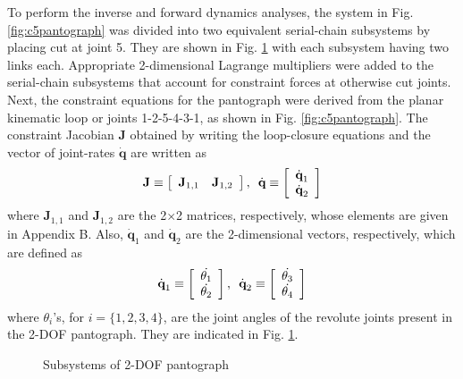 {To perform the inverse and forward dynamics analyses, the system in Fig. \ref{fig:c5pantograph} was divided into two equivalent serial-chain subsystems by placing cut at joint 5. They are shown in Fig. \ref{fig:c5pantosubsystems} with each subsystem having two links each. Appropriate 2-dimensional Lagrange multipliers were added to the serial-chain subsystems that account for constraint forces at otherwise cut joints. Next, the constraint equations for the pantograph were derived from the planar kinematic loop or joints 1-2-5-4-3-1, as shown in Fig. \ref{fig:c5pantograph}. The constraint Jacobian \textbf{J} obtained by writing the loop-closure equations and the vector of joint-rates $\dot{\textbf{q}}$ are written as
\begin{equation}
\label{eqn:c5_Janddotq_panto}
\textbf{J} \equiv
\left[ \begin{array}{cc}
\textbf{J$_{1,1}$} & \textbf{J$_{1,2}$}  
\end{array} \right], \hspace*{5pt}
\dot{\textbf{q}} \equiv
\left[ \begin{array}{c}
\textbf{$\dot{\textbf{q}}_1$}\\
\textbf{$\dot{\textbf{q}}_2$}
\end{array} \right]
\end{equation}
where \textbf{J$_{1,1}$} and \textbf{J$_{1,2}$} are the 2$\times$2 matrices, respectively, whose elements are given in Appendix B. Also, $\dot{\textbf{q}}_1$ and $\dot{\textbf{q}}_2$ are the 2-dimensional vectors, respectively, which are defined as
\begin{equation}
\textbf{$\dot{\textbf{q}}_1$}\equiv
\left[ \begin{array}{c}
\dot{\theta_1}\\
\dot{\theta_2}\\
\end{array} \right], \hspace*{5pt}
\textbf{$\dot{\textbf{q}}_2$}\equiv
\left[ \begin{array}{c}
\dot{\theta_3}\\
\dot{\theta_4}\\
\end{array} \right]
\end{equation}
where $\theta_i$'s, for $i = \{1, 2, 3, 4\}$, are the joint angles of the revolute joints present in the 2-DOF pantograph. They are indicated in Fig. \ref{fig:c5pantosubsystems}.
\begin{figure}[t!]
	\begin{center}
		\hspace{10pt}
	\end{center}
	\caption{Subsystems of 2-DOF pantograph}
	\label{fig:c5pantosubsystems}
\end{figure}

}
